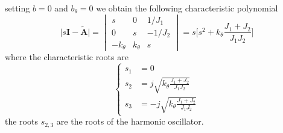 \documentclass[11pt,a4paper,oneside]{book}
\numberwithin{equation}{section}
\theoremstyle{it}
\theoremstyle{definition}
\begin{document}
\noindent setting $b=0$ and $b_\theta=0$ we obtain the following characteristic polynomial
\begin{equation}
	\Big|s\mathbf{I}-\tilde{\mathbf{A}}\Big|=\begin{vmatrix}
		s & 0 & 1/J_1 \\[6pt]
		0 & s & -1/J_2 \\[6pt]
		-k_\theta & k_\theta & s 
	\end{vmatrix} = s\Big[s^2+k_\theta\frac{J_1+J_2}{J_1J_2}\Big]
\end{equation}
where the characteristic roots are
\begin{equation}
	\left\lbrace \begin{aligned}
		s_1&=0 \\[6pt]
		s_2&=j\sqrt{k_\theta\frac{J_1+J_2}{J_1J_2}} \\[6pt]
		s_3&=-j\sqrt{k_\theta\frac{J_1+J_2}{J_1J_2}}
	\end{aligned}\right. 
\end{equation}
the roots $s_{2,3}$ are the roots of the harmonic oscillator.
\end{document}
